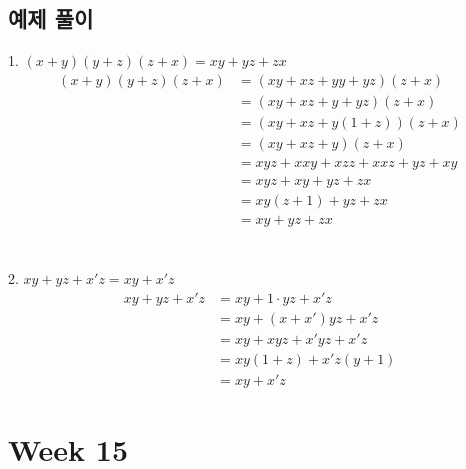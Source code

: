 \subsection{예제 풀이}
1. $(x+y)(y+z)(z+x)= xy + yz + zx$
\begin{align*}
    (x+y)(y+z)(z+x) & = (xy + xz + yy + yz)(z + x)      \\
                    & = (xy + xz + y + yz)(z + x)       \\
                    & = (xy + xz + y (1 + z))(z + x)    \\
                    & = (xy + xz + y)(z + x)            \\
                    & = xyz + xxy + xzz + xxz + yz + xy \\
                    & = xyz + xy + yz + zx              \\
                    & = xy(z + 1) + yz + zx             \\
                    & = xy + yz + zx
\end{align*}\phantom{}
\\\\
2. $xy + yz + x' z = xy + x' z$
\begin{align*}
    xy + yz + x' z & = xy + 1\cdot yz + x' z   \\
                   & = xy + (x+x')yz + x' z    \\
                   & = xy + xyz + x' yz + x' z \\
                   & = xy(1 + z) + x' z(y + 1) \\
                   & = xy + x' z
\end{align*}

\newpage
\section{Week 15}
